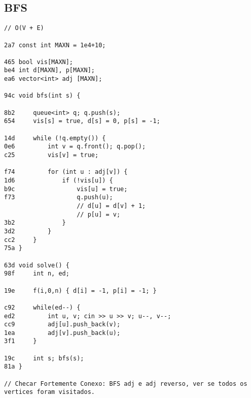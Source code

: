\documentclass[11pt, a4paper, twoside]{article}
\begin{document}
\subsection{BFS}
\begin{lstlisting}
// O(V + E)

2a7 const int MAXN = 1e4+10;

465 bool vis[MAXN];
be4 int d[MAXN], p[MAXN];
ea6 vector<int> adj [MAXN];

94c void bfs(int s) {
    
8b2     queue<int> q; q.push(s);
654     vis[s] = true, d[s] = 0, p[s] = -1;
    
14d     while (!q.empty()) {
0e6         int v = q.front(); q.pop(); 
c25         vis[v] = true;
            
f74         for (int u : adj[v]) {
1d6             if (!vis[u]) {
b9c                 vis[u] = true;
f73                 q.push(u);
                    // d[u] = d[v] + 1;
                    // p[u] = v;
3b2             }
3d2         }
cc2     }
75a }

63d void solve() {
98f     int n, ed; 
        
19e 	f(i,0,n) { d[i] = -1, p[i] = -1; }    
    	
c92 	while(ed--) {
ed2         int u, v; cin >> u >> v; u--, v--;
cc9         adj[u].push_back(v);
1ea         adj[v].push_back(u);
3f1     }
    
19c 	int s; bfs(s);
81a }

// Checar Fortemente Conexo: BFS adj e adj reverso, ver se todos os vertices foram visitados.
\end{lstlisting}
\end{document}
